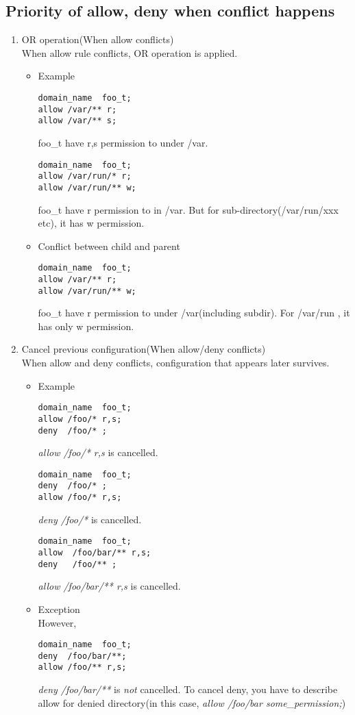 \documentclass{article}
\begin{document}
\subsection{Priority of allow, deny when conflict happens}
 \begin{enumerate}
  \item OR operation(When allow conflicts) \\
	When allow rule conflicts, 
	OR operation is applied.\\
	\begin{itemize}
	 \item Example
	       \begin{verbatim}
domain_name  foo_t;
allow /var/** r;
allow /var/** s;
	       \end{verbatim}
foo\_t have r,s permission to under /var.
	       \begin{verbatim}
domain_name  foo_t;
allow /var/run/* r;
allow /var/run/** w;
	       \end{verbatim}
foo\_t have r permission to in /var.
But for sub-directory(/var/run/xxx etc), it has w permission.

  \item Conflict between child and parent
	       \begin{verbatim}
domain_name  foo_t;
allow /var/** r;
allow /var/run/** w;
	       \end{verbatim}

foo\_t have r permission to under /var(including subdir).
For /var/run , it has only w permission.
	\end{itemize}

  \item Cancel previous configuration(When allow/deny conflicts)\\
	When allow and deny conflicts, 
configuration that appears later survives.
       \begin{itemize}
	  \item Example
		\begin{verbatim}
domain_name  foo_t;
allow /foo/* r,s;
deny  /foo/* ;
		\end{verbatim}
		{\it allow /foo/* r,s} is cancelled.
		\begin{verbatim}
domain_name  foo_t;
deny  /foo/* ;
allow /foo/* r,s;
		\end{verbatim}
		{\it deny /foo/* } is cancelled.

		\begin{verbatim}
domain_name  foo_t;
allow  /foo/bar/** r,s;
deny   /foo/** ;
		\end{verbatim}
		{\it allow /foo/bar/** r,s} is cancelled.

	\item Exception\\
		However,		
		\begin{verbatim}
domain_name  foo_t;
deny  /foo/bar/**;
allow /foo/** r,s;
		\end{verbatim}
		{\it deny /foo/bar/**}  is {\it not} cancelled. To
		cancel deny, you have to describe allow for denied
		directory(in this case, {\it allow /foo/bar some\_permission;})
       \end{itemize}
 \end{enumerate}
\end{document}
